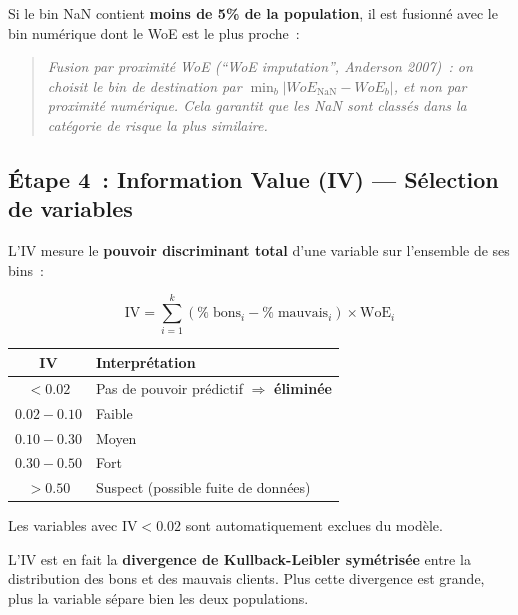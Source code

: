 \documentclass[12pt,a4paper]{article}
\begin{document}
Si le bin NaN contient \textbf{moins de 5\% de la population}, il est fusionn\'e avec le bin num\'erique dont le WoE est le plus proche~:

\begin{quote}
\textit{Fusion par proximit\'e WoE (``WoE imputation'', Anderson 2007)~: on choisit le bin de destination par $\min_b |WoE_{\text{NaN}} - WoE_b|$, et non par proximit\'e num\'erique. Cela garantit que les NaN sont class\'es dans la cat\'egorie de risque la plus similaire.}
\end{quote}

\subsection{\'Etape 4~: Information Value (IV) --- S\'election de variables}

L'IV mesure le \textbf{pouvoir discriminant total} d'une variable sur l'ensemble de ses bins~:

\begin{formulebox}
\begin{equation}
    \text{IV} = \sum_{i=1}^{k} \left(\%\;\text{bons}_i - \%\;\text{mauvais}_i\right) \times \text{WoE}_i
    \label{eq:iv}
\end{equation}
\end{formulebox}

\begin{center}
\begin{tabular}{cl}
\toprule
\textbf{IV} & \textbf{Interpr\'etation} \\
\midrule
$< 0.02$ & Pas de pouvoir pr\'edictif $\Rightarrow$ \textbf{\'elimin\'ee} \\
$0.02 - 0.10$ & Faible \\
$0.10 - 0.30$ & Moyen \\
$0.30 - 0.50$ & Fort \\
$> 0.50$ & Suspect (possible fuite de donn\'ees) \\
\bottomrule
\end{tabular}
\end{center}

Les variables avec $\text{IV} < 0.02$ sont automatiquement exclues du mod\`ele.

\begin{interpretbox}
L'IV est en fait la \textbf{divergence de Kullback-Leibler sym\'etris\'ee} entre la distribution des bons et des mauvais clients. Plus cette divergence est grande, plus la variable s\'epare bien les deux populations.
\end{interpretbox}
\end{document}
